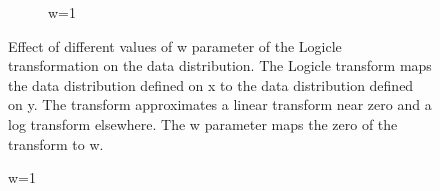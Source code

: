 \begin{figure}[h]
\begin{subfigure}[b]{.4\textwidth}
    \caption{w=1}
\end{subfigure}
{Effect of different values of w parameter of the Logicle transformation on the data distribution.}
{
  The Logicle transform maps the data distribution defined on x to the data distribution defined on y.
  The transform approximates a linear transform near zero and a log transform elsewhere.
  The w parameter maps the zero of the transform to w.
}
\end{figure} 





